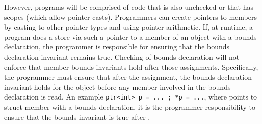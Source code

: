 However, programs will be comprised of code that is also unchecked or that has
 scopes (which allow pointer casts).   Programmers can create pointers
to members by casting to other pointer types and using pointer arithmetic.
If, at runtime, a program does a store via such a pointer to a member of an object
with a bounds declaration, the programmer is responsible for ensuring that the bounds declaration
invariant remains true.  Checking of bounds declaration will not enforce that member bounds invariants hold after 
those assignments.  
Specifically, the programmer must ensure that after the assignment, 
the bounds declaration invariant holds for the object before any member involved in the
 bounds declaration is read.
An example  \lstinline|ptr<int> p = ... ; *p = ...|,
where  points to struct member with a bounds declaration, it is the programmer
responsibility to ensure that the bounds invariant is true after .


